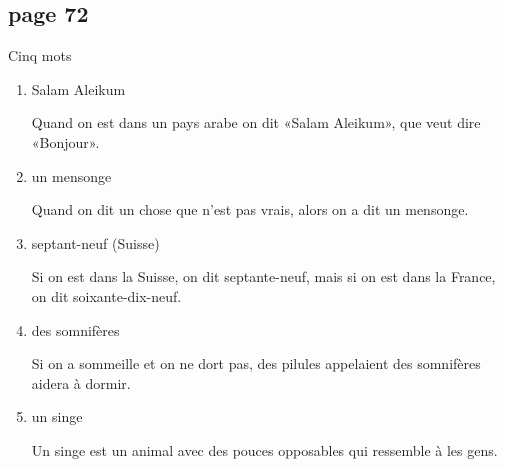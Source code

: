 \documentclass[letterpaper]{article}
\begin{document}
\doublespacing
\subsection*{page 72}
Cinq mots
\begin{enumerate}
\item Salam Aleikum

Quand on est dans un pays arabe on dit «Salam Aleikum», que veut dire «Bonjour».
\item un mensonge

Quand on dit un chose que n'est pas vrais, alors on a dit un mensonge.
\item septant-neuf (Suisse)

Si on est dans la Suisse, on dit septante-neuf, mais si on est dans la France, on dit soixante-dix-neuf.
\item des somnifères

Si on a sommeille et on ne dort pas, des pilules appelaient des somnifères aidera à dormir.
\item un singe

Un singe est un animal avec des pouces opposables qui ressemble à les gens.
\end{enumerate}
\end{document}
